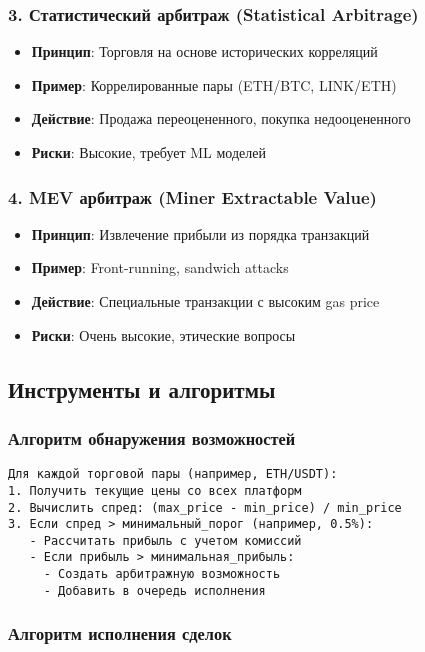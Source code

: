 \documentclass[a4paper,11pt]{article}
\begin{document}
\subsubsection{3. Статистический арбитраж (Statistical Arbitrage)}
\begin{itemize}
    \item \textbf{Принцип}: Торговля на основе исторических корреляций
    \item \textbf{Пример}: Коррелированные пары (ETH/BTC, LINK/ETH)
    \item \textbf{Действие}: Продажа переоцененного, покупка недооцененного
    \item \textbf{Риски}: Высокие, требует ML моделей
\end{itemize}

\subsubsection{4. MEV арбитраж (Miner Extractable Value)}
\begin{itemize}
    \item \textbf{Принцип}: Извлечение прибыли из порядка транзакций
    \item \textbf{Пример}: Front-running, sandwich attacks
    \item \textbf{Действие}: Специальные транзакции с высоким gas price
    \item \textbf{Риски}: Очень высокие, этические вопросы
\end{itemize}

\subsection{Инструменты и алгоритмы}

\subsubsection{Алгоритм обнаружения возможностей}

\begin{verbatim}
Для каждой торговой пары (например, ETH/USDT):
1. Получить текущие цены со всех платформ
2. Вычислить спред: (max_price - min_price) / min_price
3. Если спред > минимальный_порог (например, 0.5%):
   - Рассчитать прибыль с учетом комиссий
   - Если прибыль > минимальная_прибыль:
     - Создать арбитражную возможность
     - Добавить в очередь исполнения
\end{verbatim}

\subsubsection{Алгоритм исполнения сделок}
\end{document}
